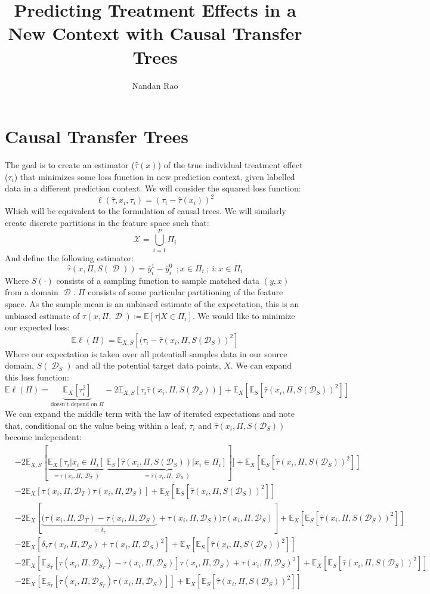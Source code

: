 \documentclass[a4paper,12pt]{article}
\title{ Predicting Treatment Effects in a New Context with Causal Transfer Trees }
\author{Nandan Rao}
\DeclareMathOperator*{\D}{\mathcal{D}}
\begin{document}
\section{ Causal Transfer Trees }

\newcommand{\TTs}{\hat{\tau}(x_i, \Pi, S(\mathcal{D}_S))}
\newcommand{\TTt}{\hat{\tau}(x_i, \Pi, S(\mathcal{D}_T))}
\newcommand{\TT}{\tau(X, \Pi)}
\newcommand{\Ex}{\mathbb{E}}

The goal is to create an estimator ($\hat{\tau}(x)$) of the true individual treatment effect ($\tau_i$) that minimizes some loss function in new prediction context, given labelled data in a different prediction context. We will consider the squared loss function:
%
$$
\ell(\hat{\tau}, x_i, \tau_i) = (\tau_i - \hat{\tau}(x_i))^2
$$
%
Which will be equivalent to the formulation of causal trees. We will similarly create discrete partitions in the feature space such that:
%
$$
\mathcal{X} = \bigcup\limits_{i=1}^{P} \Pi_i
$$
%
And define the following estimator:
%
$$
\hat{\tau}(x, \Pi, S(\D)) =  \bar{y}^1_i - \bar{y}^0_i \ \ ; x \in \Pi_i\ ; \ i : x \in \Pi_i
$$
%
Where $S(\cdot)$ consists of a sampling function to sample matched data $(y, x)$ from a domain $\D$. $\Pi$ consists of some particular partitioning of the feature space. As the sample mean is an unbiased estimate of the expectation, this is an unbiased estimate of $\tau(x,\Pi, \D) \coloneqq \mathbb{E}[\tau | X \in \Pi_i ]$. We would like to minimize our expected loss:
%
$$
\Ex \ell(\Pi) = \Ex_{X, S} [ (\tau_i - \TTs^2  ]
$$
%
Where our expectation is taken over all potentiall samples data in our source domain, $S(\D_S)$ and all the potential target data points, $X$. We can expand this loss function:
%
$$
\Ex \ell(\Pi) = \underbrace{\Ex_{X} [ \tau_i^2]}_{\text{doesn't depend on $\Pi$}} - 2 \Ex_{X, S}[ \tau_i\TTs] + \Ex_{X}[  \Ex_{S} [\TTs^2 ]]
$$
%
We can expand the middle term with the law of iterated expectations and note that, conditional on the value being within a leaf, $\tau_i$ and $\TTs$ become independent:
%
\begin{align*}
&-2 \Ex_{X,S}[ \underbrace{\Ex_{X}[ \tau_i | x_i \in \Pi_i]}_{= \tau(x_i, \Pi, \D_T)} \ \underbrace{\Ex_{S} [ \TTs | x_i \in \Pi_i]}_{= \tau(x_i, \Pi, \D_S)}] ] + \Ex_{X}[  \Ex_{S} [\TTs^2 ]]\\
&-2 \Ex_{X}[ \tau(x_i, \Pi, \mathcal{D}_T)  \tau(x_i, \Pi, \mathcal{D}_S) ] + \Ex_{X}[  \Ex_{S} [\TTs^2 ]] \\
&-2 \Ex_{X}[ \underbrace{(\tau(x_i, \Pi, \mathcal{D}_T) - \tau(x_i, \Pi, \mathcal{D}_S)}_{= \delta_{\tau}} + \tau(x_i, \Pi, \mathcal{D}_S)) \tau(x_i, \Pi, \mathcal{D}_S) ] + \Ex_{X}[  \Ex_{S} [\TTs^2 ]] \\
&-2 \Ex_{X}[ \delta_{\tau} \tau(x_i, \Pi, \mathcal{D}_S) + \tau(x_i, \Pi, \mathcal{D}_S)^2 ] + \Ex_{X}[  \Ex_{S} [\TTs^2 ]] \\
&-2 \Ex_{X}[ \Ex_{S_T}[\tau(x_i, \Pi, \mathcal{D}_{S_T}) - \tau(x_i, \Pi, \mathcal{D}_S)] \tau(x_i, \Pi, \mathcal{D}_S) + \tau(x_i, \Pi, \mathcal{D}_S)^2 ] + \Ex_{X}[  \Ex_{S} [\TTs^2 ]] \\
&-2 \Ex_{X}[ \Ex_{S_T}[\tau(x_i, \Pi, \mathcal{D}_{S_T})\tau(x_i, \Pi, \mathcal{D}_S)] ] + \Ex_{X}[  \Ex_{S} [\TTs^2 ]]
\end{align*}
\end{document}
